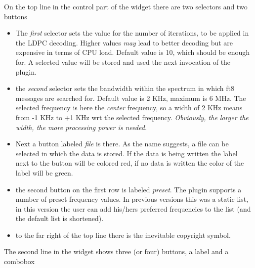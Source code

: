 \documentclass[11pt]{article}
\begin{document}
On the top  line in the control part of the widget there are
two selectors and two buttons
\begin{itemize}
\item
The {\em first} selector sets the value for the number of iterations,
to be applied in the LDPC decoding. Higher values
{\em may} lead to better decoding but are expensive in terms of CPU load.
Default value is 10, which should be enough for.
A selected value will be stored and used the
next invocation of the plugin.
\item
 the {\em second} selector sets the bandwidth within the spectrum
in which ft8 messages are searched for.
Default value is 2 KHz, maximum is 6 MHz.
The selected frequency is here the {\em center} frequency, so a
width of 2 KHz means from -1 KHz to +1 KHz wrt the selected frequency.
{\em Obviously, the larger the width, the more processing power is needed.}
\item
Next a button labeled {\em file} is there. As the name suggests, a file can
be selected in which the data is stored. If the data is being written the
label next to the button will be colored red, if no data is written the color
of the label will be green.
\item the second button on the first row is labeled {\em preset}. The plugin 
supports a number of preset frequency values. In previous versions this was a
static list, in this version the user can add his/hers preferred frequencies
to the list (and the default list is shortened).
\item to the far right of the top line there is the inevitable copyright symbol.
\end{itemize}
The second line in the widget shows three (or four) buttons, a label
and a combobox
\end{document}
